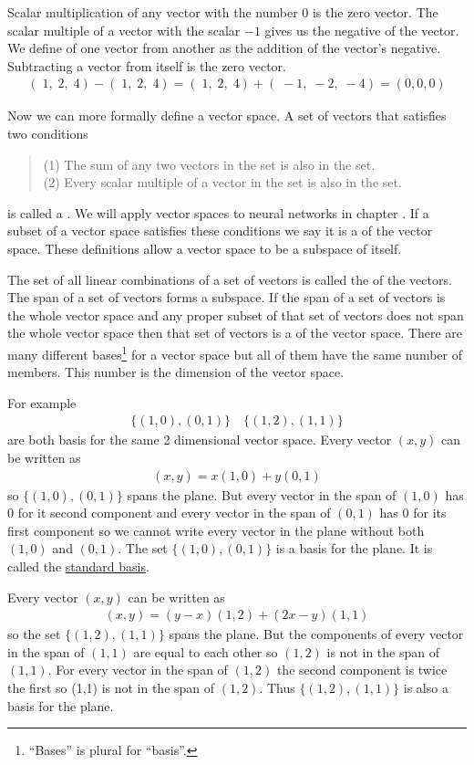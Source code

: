    Scalar multiplication of any vector with the number $0$ is the zero vector.
The scalar multiple of a vector with the scalar $-1$ gives us the negative
of the vector. We define  of one vector from 
another as the addition of the vector's negative. Subtracting a vector from 
itself is the zero vector.
\begin{eqnarray*}
  (\; 1, \; 2, \; 4) - (\; 1, \; 2, \; 4) = 
  (\; 1, \; 2, \; 4) + (\; -1, \; -2, \; -4) = (0,0,0)
\end{eqnarray*}

 Now we can more formally define a vector space. A set of vectors that satisfies two conditions
\begin{quote}
(1) The sum of any two vectors in the set is also in the set.\\
(2) Every scalar multiple of a vector in the set is also in the set. 
\end{quote}
is called a . We will apply vector spaces to neural 
networks in chapter . If a subset of a vector space satisfies these 
conditions we say it is a  of the vector space. These 
definitions allow a vector space to be a subspace of itself. 

   The set of all linear combinations of a set of vectors is called the 
 of the vectors. The span of a set of vectors forms a 
subspace. If the span of a set of vectors is the whole vector space and any
proper subset of that set of vectors does not span the whole vector space then 
that set of vectors is a  of the vector space. There are
many different bases\footnote{``Bases'' is plural for ``basis''.} for a vector space but 
all of them have the same number of members. This number is the dimension of 
the vector space. 

   For example
\begin{eqnarray*}
\{ (1,0), (0,1) \} \quad \{ (1,2), (1,1) \}
\end{eqnarray*}
are both basis for the same 2 dimensional vector space. Every vector $(x,y)$
can be written as
\begin{eqnarray*}
(x,y) = x(1,0)+y(0,1)
\end{eqnarray*}  
so $\{ (1,0), (0,1) \}$ spans the plane. But every vector in the span of
$(1,0)$ has $0$ for it second component and every vector in the span of $(0,1)$
has $0$ for its first component so we cannot write every vector in the plane 
without both $(1,0)$ and $(0,1)$. The set $\{ (1,0), (0,1) \}$ is a basis for 
the plane. It is called the \underline{standard basis}. 

   Every vector $(x,y)$ can be written as
\begin{eqnarray*}
 (x,y) =(y-x)(1,2) +(2x-y)(1,1)
\end{eqnarray*}  
so the set $\{ (1,2), (1,1) \}$ spans the plane. But the components of every 
vector in the span of $(1,1)$ are equal to each other so $(1,2)$ is not in the 
span of $(1,1)$. For every vector in the span of $(1,2)$ the second
component is twice the first so (1,1) is not in the span of $(1,2)$. Thus 
$\{ (1,2), (1,1) \}$ is also a basis for the plane. 
